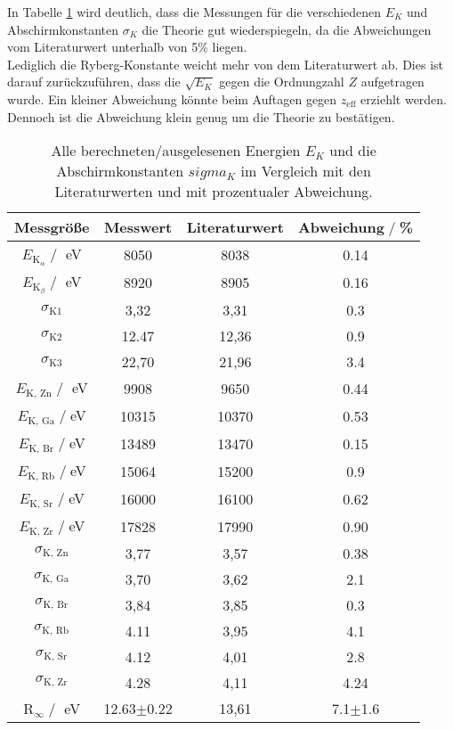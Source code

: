 In Tabelle \ref{tab:vergleich} wird deutlich, dass die Messungen für die verschiedenen
$E_K$ und Abschirmkonstanten $\sigma_K$ die Theorie gut wiederspiegeln, da die 
Abweichungen vom Literaturwert unterhalb von 5\% liegen.\\
Lediglich die Ryberg-Konstante weicht mehr von dem Literaturwert ab. Dies ist darauf zurückzuführen,
dass die $\sqrt{E_K}$ gegen die Ordnungzahl $Z$ aufgetragen wurde. Ein kleiner Abweichung
könnte beim Auftagen gegen $z_{\text{eff}}$ erziehlt werden.\\
Dennoch ist die Abweichung klein genug um die Theorie zu bestätigen.  
\begin{table}[H]
    \centering
    \begin{tabular}{c | c c c}
        \toprule
        {Messgröße} & {Messwert} & {Literaturwert}& Abweichung$\;/\;$\% \\
        \midrule
        $E_{\text{K}_{\alpha}}\;/\;$ eV & 8050 & 8038& 0.14  \\
        $E_{\text{K}_{\beta}}\;/\;$ eV  & 8920 & 8905& 0.16 \\
        $\sigma_{\text{K1}}$         & 3,32 & 3,31 &0.3   \\
        $\sigma_{\text{K2}}$         & 12.47& 12,36 & 0.9 \\
        $\sigma_{\text{K3}}$         & 22,70 & 21,96 & 3.4 \\
        \midrule
        $E_{\text{K, Zn}}\;/\;$ eV      & 9908  & 9650 & 0.44\\
        $E_{\text{K, Ga}}\;/\;$eV      & 10315  & 10370 & 0.53 \\
        $E_{\text{K, Br}}\;/\;$eV      & 13489 & 13470 & 0.15\\
        $E_{\text{K, Rb}}\;/\;$eV      & 15064 & 15200 & 0.9\\
        $E_{\text{K, Sr}}\;/\;$eV      & 16000 & 16100 & 0.62\\
        $E_{\text{K, Zr}}\;/\;$eV      & 17828 & 17990 & 0.90\\
        $\sigma_{\text{K, Zn}}$  & 3,77  & 3,57  & 0.38\\
        $\sigma_{\text{K, Ga}}$  & 3,70 & 3,62 & 2.1 \\
        $\sigma_{\text{K, Br}}$  & 3,84 & 3,85 & 0.3 \\
        $\sigma_{\text{K, Rb}}$  & 4.11  & 3,95 & 4.1  \\
        $\sigma_{\text{K, Sr}}$  & 4.12  & 4,01 & 2.8 \\
        $\sigma_{\text{K, Zr}}$  & 4.28  & 4,11 & 4.24 \\
        \midrule
        $\text{R}_{\infty}\;/\;$ eV & 12.63$\pm$0.22 & 13,61& 7.1$\pm$1.6 \\
        \bottomrule
    \end{tabular}
    \caption{Alle berechneten/ausgelesenen Energien $E_K$ und die Abschirmkonstanten $sigma_K$
    im Vergleich mit den Literaturwerten \cite{Absorptionskanten} und mit prozentualer Abweichung.}
    \label{tab:vergleich}
\end{table}